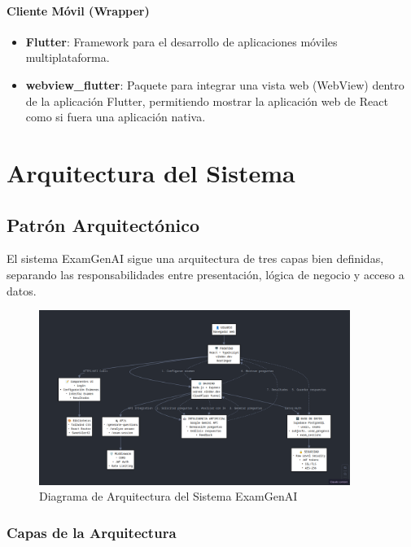 \documentclass[12pt,a4paper]{report}
\begin{document}
\subsubsection{Cliente Móvil (Wrapper)}
\begin{itemize}
    \item \textbf{Flutter}: Framework para el desarrollo de aplicaciones móviles multiplataforma.
    \item \textbf{webview\_flutter}: Paquete para integrar una vista web (WebView) dentro de la aplicación Flutter, permitiendo mostrar la aplicación web de React como si fuera una aplicación nativa.
\end{itemize}

\chapter{Arquitectura del Sistema}

\section{Patrón Arquitectónico}

El sistema ExamGenAI sigue una arquitectura de tres capas bien definidas, separando las responsabilidades entre presentación, lógica de negocio y acceso a datos.

\begin{figure}[h]
\centering
\includegraphics[width=0.9\textwidth]{arquitectura_sistema.png}
\caption{Diagrama de Arquitectura del Sistema ExamGenAI}
\label{fig:arquitectura}
\end{figure}


\subsection{Capas de la Arquitectura}
\end{document}
